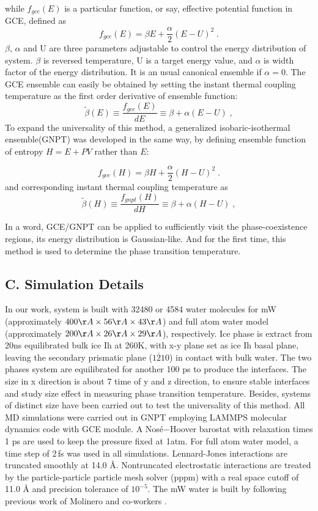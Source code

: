 \documentclass[aps,prl,twocolumn,superscriptaddress]{revtex4-1}
\begin{document}
while $f_{gce}(E)$ is a particular function, or say, effective potential function in GCE, defined as
\begin{equation}
f_{gce}(E)=\beta E+ \frac{\alpha}{2}(E−U)^2\;.
\end{equation}
$\beta$, $\alpha$ and U are three parameters adjustable to control the energy distribution of system. $\beta$ is reversed temperature, U is a target energy value, and $\alpha$  is width factor of the energy distribution. It is an usual canonical ensemble if $\alpha=0$. The GCE ensemble can easily be obtained by setting the instant thermal coupling temperature as the first order derivative of ensemble function:
\begin{equation}
\widetilde{\beta}(E)≡\frac{f_{gce}(E)}{dE}≡\beta+\alpha(E−U)\;,
\end{equation}
To expand the universality of this method, a generalized isobaric-isothermal ensemble(GNPT) was developed in the same way, by defining ensemble function of entropy $H=E+PV$ rather than $E$:

\begin{equation}
f_{gce}(H)=\beta H+ \frac{\alpha}{2}(H−U)^2\;.
\end{equation}
and corresponding instant thermal coupling temperature as
\begin{equation}
\widetilde{\beta}(H)≡\frac{f_{gnpt}(H)}{dH}≡\beta+\alpha(H−U)\;,
\end{equation}

In a word,  GCE/GNPT can be applied to sufficiently visit the phase-coexistence regions, its energy distribution is Gaussian-like\cite{Xu2012,Xu2015}. And for the first time, this method is used to determine the phase transition temperature.

\subsection{C. Simulation Details}
In our work, system is built with 32480 or 4584 water molecules for mW (approximately $400 \AA \times 56 \AA \times 43 \AA$) and full atom water model (approximately $200 \AA \times 26 \AA \times 29 \AA$), respectively. Ice phase is extract from 20ns equilibrated bulk ice Ih at 260K, with x-y plane set as ice Ih basal plane, leaving the secondary prismatic plane ($1\overline{2}10$) in contact with bulk water. The two phases system are equilibrated for another 100 ps to produce the interfaces. The size in x direction is about 7 time of y and z direction, to ensure stable interfaces and study size effect in measuring phase transition temperature. Besides, systems of distinct size have been carried out to test the universality of this method.
All MD simulations were carried out in GNPT employing LAMMPS molecular dynamics code with GCE module\cite{Xu2012}. A Nosé−Hoover barostat\cite{Nose1984,Hoover1985} with  relaxation times 1 ps are used to keep the pressure fixed at 1atm. For full atom water model, a time step of 2\,fs  was used in all simulations. Lennard-Jones interactions are truncated smoothly at 14.0 Å. Nontruncated electrostatic interactions are treated by the particle-particle particle mesh solver (pppm) with a real space cutoff of 11.0 Å and precision tolerance of $10^{-5}$.  The mW water is built by following previous work of Molinero and co-workers\cite{Molinero2009} .
\end{document}

